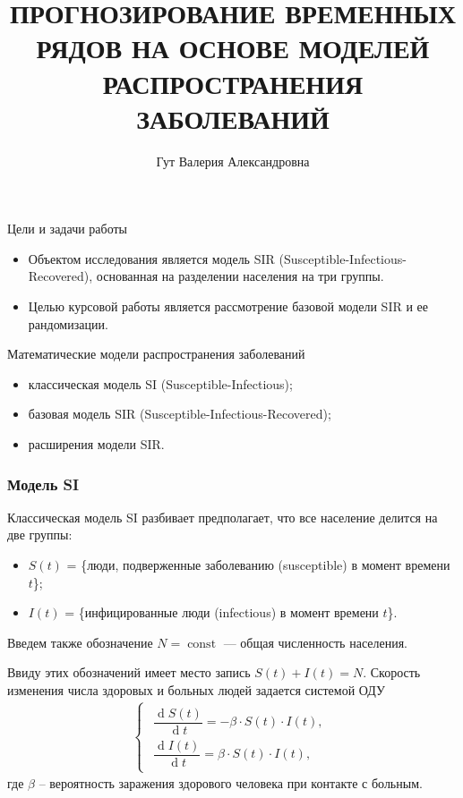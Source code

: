 \documentclass[notheorems]{beamer}
\title[Модели распространения заболеваний]{\Large ПРОГНОЗИРОВАНИЕ ВРЕМЕННЫХ РЯДОВ НА ОСНОВЕ МОДЕЛЕЙ РАСПРОСТРАНЕНИЯ ЗАБОЛЕВАНИЙ}
\author[В. А. Гут]{Гут Валерия Александровна}
\institute[]{Научный руководитель: С.В. Лобач}
\date[]{}%
\renewcommand{\d}{\operatorname{d}}
\begin{document}
\begin{frame}[plain]
  \titlepage
\end{frame}


\begin{frame}{Цели и задачи работы}

\begin{itemize}

\item Объектом исследования является модель SIR (Susceptible-Infectious-Recovered), основанная на разделении населения на три группы.

\item Целью курсовой работы является рассмотрение базовой модели SIR и ее рандомизации.

\end{itemize}

\end{frame}


\begin{frame}
	{Математические модели распространения заболеваний}
	\begin{itemize}
		\item классическая модель SI (Susceptible-Infectious);
		\item базовая модель SIR (Susceptible-Infectious-Recovered);
		\item расширения модели SIR.
	\end{itemize}
\end{frame}


\begin{frame}
	\frametitle{Модель SI}
	Классическая модель SI разбивает предполагает, что все население делится на две группы:
	\begin{itemize}
		\item $S(t)$ = \{люди, подверженные заболеванию (susceptible) в момент времени $t$\};
		\item $I(t)$ = \{инфицированные люди (infectious) в момент времени $t$\}.
	\end{itemize}
	Введем также обозначение $N = \operatorname{const}$ --- общая численность населения.
	
	Ввиду этих обозначений имеет место запись $S(t) + I(t) = N.$
	Скорость изменения числа здоровых и больных людей задается системой ОДУ 
	\begin{eqnarray}
		\left\{ 
		\begin{gathered} 
			\begin{aligned}
				\dfrac{\d S(t)}{\d t} = -\beta\cdot S(t)\cdot I(t),\\
				\dfrac{\d I(t)}{\d t} = \beta\cdot S(t)\cdot I(t),
			\end{aligned}
		\end{gathered} 
		\right.
	\end{eqnarray}
	где $\beta$ -- вероятность заражения здорового человека при контакте с больным.
\end{frame}
\end{document}
